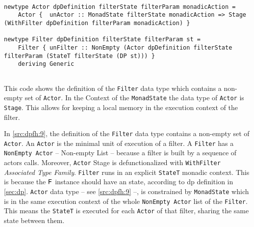 \begin{listing}[h!]
 \scriptsize{
  \begin{verbatim}

newtype Actor dpDefinition filterState filterParam monadicAction =
    Actor {  unActor :: MonadState filterState monadicAction => Stage (WithFilter dpDefinition filterParam monadicAction) }

newtype Filter dpDefinition filterState filterParam st =
    Filter { unFilter :: NonEmpty (Actor dpDefinition filterState filterParam (StateT filterState (DP st))) }
    deriving Generic
    
  \end{verbatim}
  }
  \caption[{[\texttt{Stage.hs}] Filter / Actor Data Type}]{This code shows the definition of the \texttt{Filter} data type which contains a non-empty set of \texttt{Actor}. In the Context of the \texttt{MonadState} the data type of  \texttt{Actor} is  \texttt{Stage}. This allows for keeping a local memory in the execution context of the filter.}
  \label{src:dpfh:9}
\end{listing}

In \autoref{src:dpfh:9}, the definition of the \texttt{Filter} data type contains a non-empty set of \texttt{Actor}.
An \texttt{Actor} is the minimal unit of execution of a filter. 
A \texttt{Filter} has a \texttt{NonEmpty Actor} -- Non-empty List -- because a filter is built by a sequence of actors calls. 
Moreover, \texttt{Actor} Stage is defunctionalized with \texttt{WithFilter} \emph{Associated Type Family}. 
\texttt{Filter} runs in an explicit \texttt{StateT} monadic context. This is because the $\mathsf{F}$ instance should have an state, according to \acrshort{dp} definition in \autoref{sec:dp}. 
\texttt{Actor} data type -- see \autoref{src:dpfh:9} --, is constrained by \texttt{MonadState} which is in the same execution context of the whole \texttt{NonEmpty Actor} list of the \texttt{Filter}. 
This means the \texttt{StateT} is executed for each \texttt{Actor} of that filter, sharing the same state between them. 

